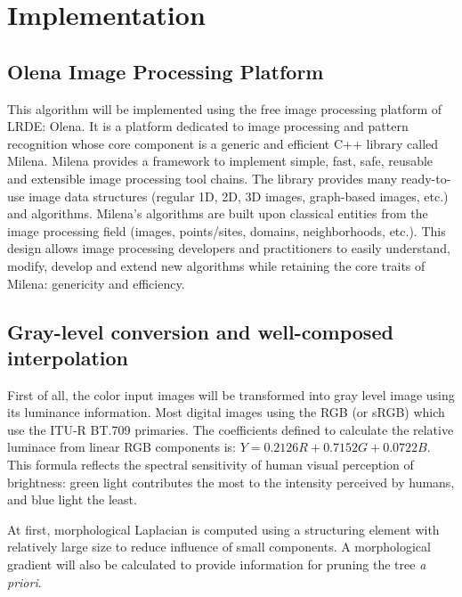 
\graphicspath{ {5chapterImplementation/image/} }
\chapter{Implementation}


\section{Olena Image Processing Platform}
This algorithm will be implemented using the free image processing platform of LRDE: Olena. It is a platform dedicated to image processing and pattern recognition whose core component is a generic and efficient C++ library called Milena. Milena provides a framework to implement simple, fast, safe, reusable and extensible image processing tool chains. The library provides many ready-to-use image data structures (regular 1D, 2D, 3D images, graph-based images, etc.) and algorithms. Milena's algorithms are built upon classical entities from the image processing field (images, points/sites, domains, neighborhoods, etc.). This design allows image processing developers and practitioners to easily understand, modify, develop and extend new algorithms while retaining the core traits of Milena: genericity and efficiency.

\section{Gray-level conversion and well-composed interpolation}
First of all, the color input images will be transformed into gray level image using its luminance information. Most digital images using the RGB (or sRGB) which use the ITU-R BT.709 primaries. The coefficients defined to calculate the relative luminace from linear RGB components is: $Y = 0.2126R + 0.7152G + 0.0722B$. This formula reflects the spectral sensitivity of human visual perception of brightness: green light contributes the most to the intensity perceived by humans, and blue light the least.

\par At first, morphological Laplacian is computed using a structuring element with relatively large size to reduce influence of small components. A morphological gradient will also be calculated to provide information for pruning the tree \textit{a priori}. 

